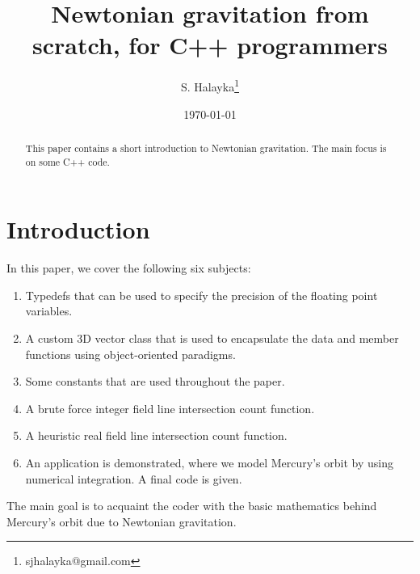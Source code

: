 \documentclass[12pt]{article}
\title{Newtonian gravitation from scratch, for C++ programmers}
\author{S. Halayka\footnote{sjhalayka@gmail.com}}
\date{\today\;\currenttime}
\begin{document}
 
\maketitle

\begin{abstract}
This paper contains a short introduction to Newtonian gravitation.
The main focus is on some C++ code.
\end{abstract}




\section{Introduction}

In this paper, we cover the following six subjects:
\begin{enumerate}
\item Typedefs that can be used to specify the precision of the floating point variables.
\item A custom 3D vector class that is used to encapsulate the data and member functions using object-oriented paradigms.
\item Some constants that are used throughout the paper.
\item A brute force integer field line intersection count function.
\item A heuristic real field line intersection count function.
\item An application is demonstrated, where we model Mercury's orbit by using numerical integration.
A final code is given.
\end{enumerate}

The main goal is to acquaint the coder with the basic mathematics behind Mercury's orbit due to Newtonian gravitation.
\end{document}
